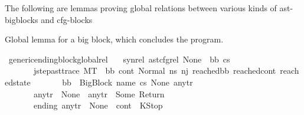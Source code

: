 \begin{isabellebody}
\begin{isamarkuptext}
The following are lemmas proving global relations between various kinds of ast-bigblocks and cfg-blocks%
\end{isamarkuptext}\isamarkuptrue%
%
\begin{isamarkuptext}%
Global lemma for a big block, which concludes the program.%
\end{isamarkuptext}\isamarkuptrue%
\isamarkupfalse%
\ generic{\isacharunderscore}{\kern0pt}ending{\isacharunderscore}{\kern0pt}block{\isacharunderscore}{\kern0pt}global{\isacharunderscore}{\kern0pt}rel{\isacharcolon}{\kern0pt}\isanewline
\ \ \ syn{\isacharunderscore}{\kern0pt}rel{\isacharcolon}{\kern0pt}\ {\isachardoublequoteopen}ast{\isacharunderscore}{\kern0pt}cfg{\isacharunderscore}{\kern0pt}rel\ None\ {\isacharbrackleft}{\kern0pt}{\isacharbrackright}{\kern0pt}\ bb\ cs{}{\isachardoublequoteclose}\isanewline
\ \ \ \ \ \ \ j{\isacharunderscore}{\kern0pt}step{\isacharunderscore}{\kern0pt}ast{\isacharunderscore}{\kern0pt}trace{\isacharcolon}{\kern0pt}\ {\isachardoublequoteopen}M{\isacharcomma}{\kern0pt}{\isasymLambda}{\isacharcomma}{\kern0pt}{\isasymGamma}{\isacharcomma}{\kern0pt}{\isasymOmega}{\isacharcomma}{\kern0pt}T\ {\isasymturnstile}\ {\isacharparenleft}{\kern0pt}bb{\isacharcomma}{\kern0pt}\ cont{}{\isacharcomma}{\kern0pt}\ {\isacharparenleft}{\kern0pt}Normal\ ns{}{\isacharparenright}{\kern0pt}{\isacharparenright}{\kern0pt}\ {\isacharminus}{\kern0pt}n{\isasymlongrightarrow}{\isacharcircum}{\kern0pt}j\ {\isacharparenleft}{\kern0pt}reached{\isacharunderscore}{\kern0pt}bb{\isacharcomma}{\kern0pt}\ reached{\isacharunderscore}{\kern0pt}cont{\isacharcomma}{\kern0pt}\ reached{\isacharunderscore}{\kern0pt}state{\isacharparenright}{\kern0pt}{\isachardoublequoteclose}\isanewline
\ \ \ \ \ \ \ {\isachardoublequoteopen}bb\ {\isacharequal}{\kern0pt}\ {\isacharparenleft}{\kern0pt}BigBlock\ name\ cs{}\ None\ any{\isacharunderscore}{\kern0pt}tr{\isacharparenright}{\kern0pt}{\isachardoublequoteclose}\isanewline
\ \ \ \ \ \ \ {\isachardoublequoteopen}{\isacharparenleft}{\kern0pt}{\isacharparenleft}{\kern0pt}any{\isacharunderscore}{\kern0pt}tr\ {\isacharequal}{\kern0pt}\ None{\isacharparenright}{\kern0pt}{\isacharparenright}{\kern0pt}\ {\isasymor}\ {\isacharparenleft}{\kern0pt}any{\isacharunderscore}{\kern0pt}tr\ {\isacharequal}{\kern0pt}\ {\isacharparenleft}{\kern0pt}Some\ Return{\isacharparenright}{\kern0pt}{\isacharparenright}{\kern0pt}{\isachardoublequoteclose}\isanewline
\ \ \ \ \ \ \ ending{\isacharcolon}{\kern0pt}\ {\isachardoublequoteopen}any{\isacharunderscore}{\kern0pt}tr\ {\isacharequal}{\kern0pt}\ None\ {\isasymLongrightarrow}\ cont{}\ {\isacharequal}{\kern0pt}\ KStop{\isachardoublequoteclose}\isanewline

\end{isabellebody}
